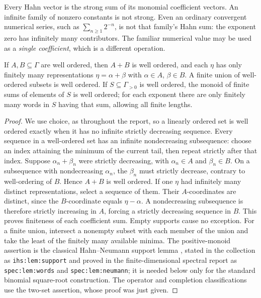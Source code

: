 \documentclass[11pt,letterpaper]{article}
\numberwithin{equation}{section}
\theoremstyle{definition}
\theoremstyle{remark}
\newcommand{\ihs}[1]{\texttt{ihs:#1}}
\newcommand{\lab}[1]{\texttt{#1}}
\begin{document}
Every Hahn vector is the strong sum of its monomial coefficient vectors.
An infinite family of nonzero constants is not strong. Even an ordinary
convergent numerical series, such as $\sum_{n\ge1}2^{-n}$, is not
that family's Hahn sum: the exponent zero has infinitely many
contributors. The familiar numerical value may be used as a
\emph{single coefficient}, which is a different operation.

\begin{lemma}\label{duals:lem:support}
If $A,B\subseteq\Gamma$ are well ordered, then $A+B$ is well ordered,
and each $\eta$ has only finitely many representations
$\eta=\alpha+\beta$ with $\alpha\in A$, $\beta\in B$.
A finite union of well-ordered subsets is well ordered.
If $S\subseteq\Gamma_{>0}$ is well ordered, the monoid of finite sums
of elements of $S$ is well ordered; for each exponent there are only
finitely many words in $S$ having that sum, allowing all finite lengths.
\end{lemma}
\begin{proof}
We use choice, as throughout the report, so a linearly ordered set is
well ordered exactly when it has no infinite strictly decreasing sequence.
Every sequence in a well-ordered set has an infinite nondecreasing
subsequence: choose an index attaining the minimum of the current tail,
then repeat strictly after that index. Suppose
$\alpha_n+\beta_n$ were strictly decreasing, with $\alpha_n\in A$ and
$\beta_n\in B$. On a subsequence with nondecreasing $\alpha_n$, the
$\beta_n$ must strictly decrease, contrary to well-ordering of $B$.
Hence $A+B$ is well ordered. If one $\eta$ had infinitely many distinct
representations, select a sequence of them. Their $A$-coordinates are
distinct, since the $B$-coordinate equals $\eta-\alpha$. A nondecreasing
subsequence is therefore strictly increasing in $A$, forcing a strictly
decreasing sequence in $B$. This proves finiteness of each coefficient
sum. Empty supports cause no exception. For a finite union, intersect a
nonempty subset with each member of the union and take the least of the
finitely many available minima. The positive-monoid assertion is
the classical Hahn--Neumann support lemma \cite{Neumann}, stated in the
collection as \ihs{lem:support} and proved in the finite-dimensional
spectral report as \lab{spec:lem:words} and \lab{spec:lem:neumann}; it is needed
below only for the standard binomial square-root construction. The
operator and completion classifications use the two-set assertion, whose
proof was just given.
\end{proof}
\end{document}
